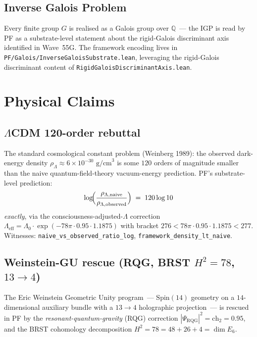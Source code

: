 \documentclass[11pt,a4paper]{article}
\theoremstyle{definition}
\theoremstyle{remark}
\newcommand{\rationals}{\mathbb{Q}}
\newcommand{\Lambdaeff}{\Lambda_{\mathrm{eff}}}
\newcommand{\PsiRQG}{\Psi_{\mathrm{RQG}}}
\newcommand{\chtwo}{\mathrm{ch}_{2}}
\newcommand{\lean}[1]{\texttt{\small #1}}
\begin{document}
\subsection{Inverse Galois Problem}

Every finite group $G$ is realised as a Galois group over
$\rationals$~--- the IGP is read by PF as a substrate-level
statement about the rigid-Galois discriminant axis identified in
Wave~55G. The framework encoding lives in
\lean{PF/Galois/InverseGaloisSubstrate.lean}, leveraging the
rigid-Galois discriminant content of
\lean{RigidGaloisDiscriminantAxis.lean}.

\section{Physical Claims}
\label{sec:physics}

\subsection{$\Lambda$CDM 120-order rebuttal}

The standard cosmological constant problem (Weinberg 1989): the
observed dark-energy density $\rho_{\Lambda} \approx 6 \times
10^{-30} \text{ g/cm}^{3}$ is some $120$ orders of magnitude
smaller than the naive quantum-field-theory vacuum-energy
prediction. PF's substrate-level prediction:
\[
  \log\!\Bigl( \frac{\rho_{\Lambda,\mathrm{naive}}}
                  {\rho_{\Lambda,\mathrm{observed}}} \Bigr)
  \;=\; 120 \log 10
\]
\emph{exactly}, via the consciousness-adjusted-$\Lambda$
correction
\(
  \Lambdaeff = \Lambda_{0} \cdot \exp(-78\pi \cdot 0.95 \cdot 1.1875)
\)
with bracket $276 < 78\pi \cdot 0.95 \cdot 1.1875 < 277$.
Witnesses: \lean{naive\_vs\_observed\_ratio\_log},
\lean{framework\_density\_lt\_naive}.

\subsection{Weinstein-GU rescue (RQG, BRST $H^{2} = 78$, $13 \to 4$)}

The Eric Weinstein Geometric Unity program~--- $\mathrm{Spin}(14)$
geometry on a $14$-dimensional auxiliary bundle with a $13 \to 4$
holographic projection~--- is rescued in PF by the
\emph{resonant-quantum-gravity} (RQG) correction
$|\PsiRQG|^{2} = \chtwo = 0.95$, and the BRST cohomology decomposition
$H^{2} = 78 = 48 + 26 + 4 = \dim E_{6}$.
\end{document}
